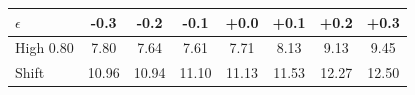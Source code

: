 \begin{tabular}{lccccccc}
\hline
$\epsilon$ & -0.3 & -0.2 & -0.1 & +0.0 & +0.1 & +0.2 & +0.3 \\
\hline
High 0.80 & 7.80 & 7.64 & 7.61 & 7.71 & 8.13 & 9.13 & 9.45 \\
Shift & 10.96 & 10.94 & 11.10 & 11.13 & 11.53 & 12.27 & 12.50 \\
\hline
\end{tabular}
